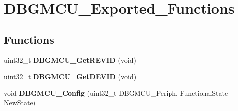 \hypertarget{group__DBGMCU__Exported__Functions}{
\section{DBGMCU\_\-Exported\_\-Functions}
\label{group__DBGMCU__Exported__Functions}
}
\subsection*{Functions}
\begin{DoxyCompactItemize}
\item 
\hypertarget{group__DBGMCU__Exported__Functions_ga47419e9ca75ab7be4c70feb82faa0511}{
uint32\_\-t {\bfseries DBGMCU\_\-GetREVID} (void)}
\label{group__DBGMCU__Exported__Functions_ga47419e9ca75ab7be4c70feb82faa0511}

\item 
\hypertarget{group__DBGMCU__Exported__Functions_gac34193c34dbce759bf424957a31b3266}{
uint32\_\-t {\bfseries DBGMCU\_\-GetDEVID} (void)}
\label{group__DBGMCU__Exported__Functions_gac34193c34dbce759bf424957a31b3266}

\item 
\hypertarget{group__DBGMCU__Exported__Functions_gadf2f267f855ac1e4c03905c5dcfbd28b}{
void {\bfseries DBGMCU\_\-Config} (uint32\_\-t DBGMCU\_\-Periph, FunctionalState NewState)}
\label{group__DBGMCU__Exported__Functions_gadf2f267f855ac1e4c03905c5dcfbd28b}

\end{DoxyCompactItemize}
